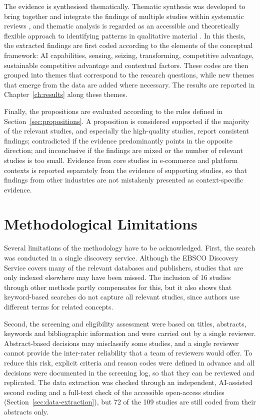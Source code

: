 The evidence is synthesised thematically. Thematic synthesis was developed to bring together and integrate the findings of multiple studies within systematic reviews \parencite[1]{thomas2008}, and thematic analysis is regarded as an accessible and theoretically flexible approach to identifying patterns in qualitative material \parencite[77]{braun2006}. In this thesis, the extracted findings are first coded according to the elements of the conceptual framework: AI capabilities, sensing, seizing, transforming, competitive advantage, sustainable competitive advantage and contextual factors. These codes are then grouped into themes that correspond to the research questions, while new themes that emerge from the data are added where necessary. The results are reported in Chapter~\ref{ch:results} along these themes.

Finally, the propositions are evaluated according to the rules defined in Section~\ref{sec:propositions}. A proposition is considered supported if the majority of the relevant studies, and especially the high-quality studies, report consistent findings; contradicted if the evidence predominantly points in the opposite direction; and inconclusive if the findings are mixed or the number of relevant studies is too small. Evidence from core studies in e-commerce and platform contexts is reported separately from the evidence of supporting studies, so that findings from other industries are not mistakenly presented as context-specific evidence.

\section{Methodological Limitations}
\label{sec:method-limitations}

Several limitations of the methodology have to be acknowledged. First, the search was conducted in a single discovery service. Although the EBSCO Discovery Service covers many of the relevant databases and publishers, studies that are only indexed elsewhere may have been missed. The inclusion of 16 studies through other methods partly compensates for this, but it also shows that keyword-based searches do not capture all relevant studies, since authors use different terms for related concepts.

Second, the screening and eligibility assessment were based on titles, abstracts, keywords and bibliographic information and were carried out by a single reviewer. Abstract-based decisions may misclassify some studies, and a single reviewer cannot provide the inter-rater reliability that a team of reviewers would offer. To reduce this risk, explicit criteria and reason codes were defined in advance and all decisions were documented in the screening log, so that they can be reviewed and replicated. The data extraction was checked through an independent, AI-assisted second coding and a full-text check of the accessible open-access studies (Section~\ref{sec:data-extraction}), but 72 of the 109 studies are still coded from their abstracts only.

